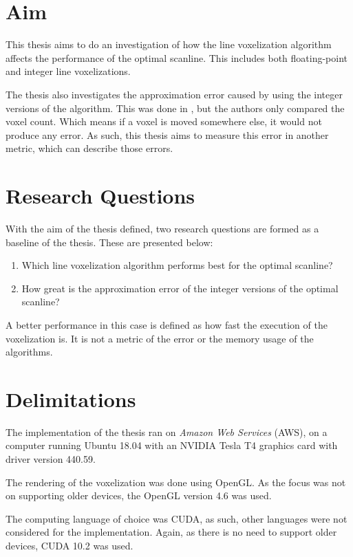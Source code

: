 \newpage

\section{Aim}
This thesis aims to do an investigation of how the line voxelization algorithm affects the performance of the optimal scanline.
This includes both floating-point and integer line voxelizations.

The thesis also investigates the approximation error caused by using the integer versions of the algorithm.
This was done in \cite{scanline-voxelization}, but the authors only compared the voxel count.
Which means if a voxel is moved somewhere else, it would not produce any error.
As such, this thesis aims to measure this error in another metric, which can describe those errors.

\section{Research Questions}
With the aim of the thesis defined, two research questions are formed as a baseline of the thesis.
These are presented below:
\begin{enumerate}
  \item \label{que:linealg} Which line voxelization algorithm performs best for the optimal scanline?
  \item \label{que:erroraprox} How great is the approximation error of the integer versions of the optimal scanline?
\end{enumerate}
A better performance in this case is defined as how fast the execution of the voxelization is.
It is not a metric of the error or the memory usage of the algorithms.

\section{Delimitations}
The implementation of the thesis ran on \textit{Amazon Web Services} (AWS), on a computer running Ubuntu 18.04 with an NVIDIA Tesla T4 graphics card with driver version 440.59.

The rendering of the voxelization was done using OpenGL.
As the focus was not on supporting older devices, the OpenGL version 4.6 was used.

The computing language of choice was CUDA, as such, other languages were not considered for the implementation.
Again, as there is no need to support older devices, CUDA 10.2 was used.

